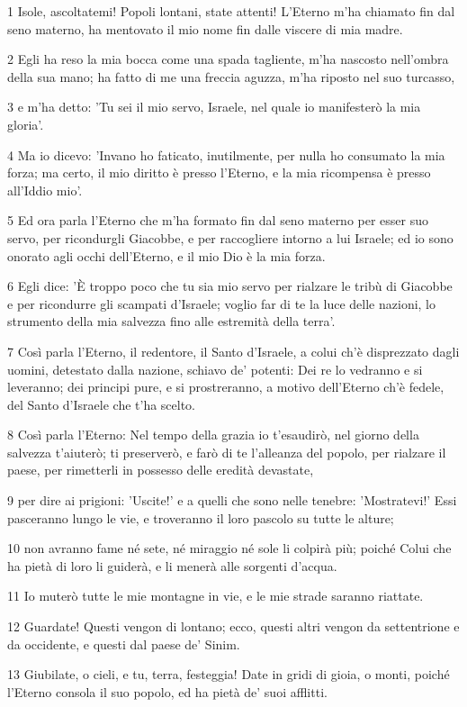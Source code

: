 \par 1 Isole, ascoltatemi! Popoli lontani, state attenti! L'Eterno m'ha chiamato fin dal seno materno, ha mentovato il mio nome fin dalle viscere di mia madre.
\par 2 Egli ha reso la mia bocca come una spada tagliente, m'ha nascosto nell'ombra della sua mano; ha fatto di me una freccia aguzza, m'ha riposto nel suo turcasso,
\par 3 e m'ha detto: 'Tu sei il mio servo, Israele, nel quale io manifesterò la mia gloria'.
\par 4 Ma io dicevo: 'Invano ho faticato, inutilmente, per nulla ho consumato la mia forza; ma certo, il mio diritto è presso l'Eterno, e la mia ricompensa è presso all'Iddio mio'.
\par 5 Ed ora parla l'Eterno che m'ha formato fin dal seno materno per esser suo servo, per ricondurgli Giacobbe, e per raccogliere intorno a lui Israele; ed io sono onorato agli occhi dell'Eterno, e il mio Dio è la mia forza.
\par 6 Egli dice: 'È troppo poco che tu sia mio servo per rialzare le tribù di Giacobbe e per ricondurre gli scampati d'Israele; voglio far di te la luce delle nazioni, lo strumento della mia salvezza fino alle estremità della terra'.
\par 7 Così parla l'Eterno, il redentore, il Santo d'Israele, a colui ch'è disprezzato dagli uomini, detestato dalla nazione, schiavo de' potenti: Dei re lo vedranno e si leveranno; dei principi pure, e si prostreranno, a motivo dell'Eterno ch'è fedele, del Santo d'Israele che t'ha scelto.
\par 8 Così parla l'Eterno: Nel tempo della grazia io t'esaudirò, nel giorno della salvezza t'aiuterò; ti preserverò, e farò di te l'alleanza del popolo, per rialzare il paese, per rimetterli in possesso delle eredità devastate,
\par 9 per dire ai prigioni: 'Uscite!' e a quelli che sono nelle tenebre: 'Mostratevi!' Essi pasceranno lungo le vie, e troveranno il loro pascolo su tutte le alture;
\par 10 non avranno fame né sete, né miraggio né sole li colpirà più; poiché Colui che ha pietà di loro li guiderà, e li menerà alle sorgenti d'acqua.
\par 11 Io muterò tutte le mie montagne in vie, e le mie strade saranno riattate.
\par 12 Guardate! Questi vengon di lontano; ecco, questi altri vengon da settentrione e da occidente, e questi dal paese de' Sinim.
\par 13 Giubilate, o cieli, e tu, terra, festeggia! Date in gridi di gioia, o monti, poiché l'Eterno consola il suo popolo, ed ha pietà de' suoi afflitti.

